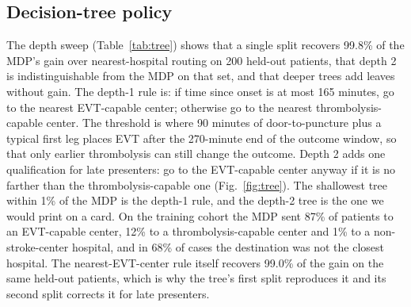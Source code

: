 \begin{table}[t]
\centering
\caption{Sensitivity of the MDP $-$ nearest-hospital difference in probability of an excellent outcome (mean and 95\% CI across replicates; realized reward for the post hoc rows, planning reward for the re-planned row).}
\label{tab:sens}
\end{table}


\subsection{Decision-tree policy}
The depth sweep (Table~\ref{tab:tree}) shows that a single split recovers 99.8\% of the MDP's gain over nearest-hospital routing on 200 held-out patients, that depth 2 is indistinguishable from the MDP on that set, and that deeper trees add leaves without gain. The depth-1 rule is: if time since onset is at most 165 minutes, go to the nearest EVT-capable center; otherwise go to the nearest thrombolysis-capable center. The threshold is where 90 minutes of door-to-puncture plus a typical first leg places EVT after the 270-minute end of the outcome window, so that only earlier thrombolysis can still change the outcome. Depth 2 adds one qualification for late presenters: go to the EVT-capable center anyway if it is no farther than the thrombolysis-capable one (Fig.~\ref{fig:tree}). The shallowest tree within 1\% of the MDP is the depth-1 rule, and the depth-2 tree is the one we would print on a card. On the training cohort the MDP sent 87\% of patients to an EVT-capable center, 12\% to a thrombolysis-capable center and 1\% to a non-stroke-center hospital, and in 68\% of cases the destination was not the closest hospital. The nearest-EVT-center rule itself recovers 99.0\% of the gain on the same held-out patients, which is why the tree's first split reproduces it and its second split corrects it for late presenters.

